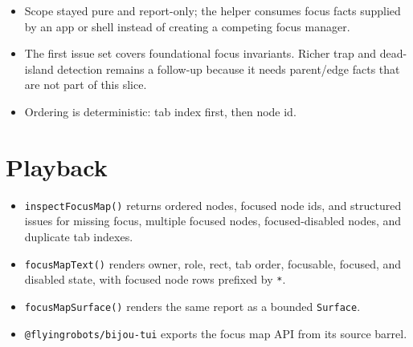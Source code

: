 \begin{itemize}
\tightlist
\item
  Scope stayed pure and report-only; the helper consumes focus facts supplied by an app or shell instead of creating a competing focus manager.
\item
  The first issue set covers foundational focus invariants. Richer trap and dead-island detection remains a follow-up because it needs parent/edge facts that are not part of this slice.
\item
  Ordering is deterministic: tab index first, then node id.
\end{itemize}

\section{Playback}\label{record-257-playback}

\begin{itemize}
\tightlist
\item
  \texttt{i\allowbreak{}n\allowbreak{}s\allowbreak{}p\allowbreak{}e\allowbreak{}c\allowbreak{}t\allowbreak{}F\allowbreak{}o\allowbreak{}c\allowbreak{}u\allowbreak{}s\allowbreak{}M\allowbreak{}a\allowbreak{}p\allowbreak{}(\allowbreak{})} returns ordered nodes, focused node ids, and structured issues for missing focus, multiple focused nodes, focused-disabled nodes, and duplicate tab indexes.
\item
  \texttt{f\allowbreak{}o\allowbreak{}c\allowbreak{}u\allowbreak{}s\allowbreak{}M\allowbreak{}a\allowbreak{}p\allowbreak{}T\allowbreak{}e\allowbreak{}x\allowbreak{}t\allowbreak{}(\allowbreak{})} renders owner, role, rect, tab order, focusable, focused, and disabled state, with focused node rows prefixed by \texttt{*}.
\item
  \texttt{f\allowbreak{}o\allowbreak{}c\allowbreak{}u\allowbreak{}s\allowbreak{}M\allowbreak{}a\allowbreak{}p\allowbreak{}S\allowbreak{}u\allowbreak{}r\allowbreak{}f\allowbreak{}a\allowbreak{}c\allowbreak{}e\allowbreak{}(\allowbreak{})} renders the same report as a bounded \texttt{S\allowbreak{}u\allowbreak{}r\allowbreak{}f\allowbreak{}a\allowbreak{}c\allowbreak{}e}.
\item
  \texttt{@\allowbreak{}f\allowbreak{}l\allowbreak{}y\allowbreak{}i\allowbreak{}n\allowbreak{}g\allowbreak{}r\allowbreak{}o\allowbreak{}b\allowbreak{}o\allowbreak{}t\allowbreak{}s\allowbreak{}/\allowbreak{}b\allowbreak{}i\allowbreak{}j\allowbreak{}o\allowbreak{}u\allowbreak{}-\allowbreak{}t\allowbreak{}u\allowbreak{}i} exports the focus map API from its source barrel.
\end{itemize}

